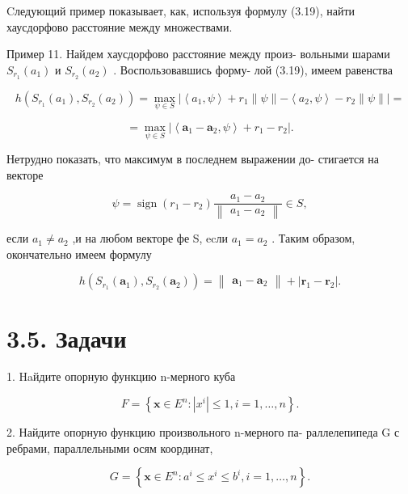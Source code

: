 \documentclass[8pt]{extarticle}
\begin{document}
Cледующий пример показывает, как, используя формулу (3.19), найти хаусдорфово расстояние между множествами.

Пример 11. Найдем хаусдорфово расстояние между произ- вольными шарами \({S}_{{r}_{1}}\left( {a}_{1}\right)\) и \({S}_{{r}_{2}}\left( {a}_{2}\right)\) . Воспользовавшись форму- лой (3.19), имеем равенства

\[
h\left( {{S}_{{r}_{1}}\left( {a}_{1}\right) ,{S}_{{r}_{2}}\left( {a}_{2}\right) }\right)  = \mathop{\max }\limits_{{\psi  \in  S}}\left| {\left\langle  {{a}_{1},\psi }\right\rangle   + {r}_{1}\parallel \psi \parallel  - \left\langle  {{a}_{2},\psi }\right\rangle   - {r}_{2}\parallel \psi \parallel }\right|  =
\]

\[
= \mathop{\max }\limits_{{\psi  \in  S}}\left| {\left\langle  {{\mathbf{a}}_{1} - {\mathbf{a}}_{2},\psi }\right\rangle   + {r}_{1} - {r}_{2}}\right| .
\]

Нетрудно показать, что максимум в последнем выражении до- стигается на векторе

\[
\psi  = \operatorname{sign}\left( {{r}_{1} - {r}_{2}}\right) \frac{{a}_{1} - {a}_{2}}{\left\lVert \begin{array}{c} {a}_{1} - {a}_{2} \end{array} \right\rVert} \in  S,
\]

если \({a}_{1} \neq  {a}_{2}\) ,и на любом векторе фе S, ecли \({a}_{1} = {a}_{2}\) . Таким образом, окончательно имеем формулу

\[
h\left( {{S}_{{r}_{1}}\left( {\mathbf{a}}_{1}\right) ,{S}_{{r}_{2}}\left( {\mathbf{a}}_{2}\right) }\right)  = \left\lVert \begin{array}{c} {{\mathbf{a}}_{1} - {\mathbf{a}}_{2}} \end{array} \right\rVert + \left| {{\mathbf{r}}_{1} - {\mathbf{r}}_{2}}\right| .
\]

\section*{3.5. Задачи}

1. Haйдите опорную функцию n-мерного куба

\[
F = \left\{  {\mathbf{x} \in  {E}^{n} : \left| {x}^{i}\right|  \leq  1,i = 1,\ldots ,n}\right\}  .
\]

2. Найдите опорную функцию произвольного n-мерного па- раллелепипеда G с ребрами, параллельными осям координат,

\[
G = \left\{  {\mathbf{x} \in  {E}^{n} : {a}^{i} \leq  {x}^{i} \leq  {b}^{i},i = 1,\ldots ,n}\right\}  .
\]
\end{document}
